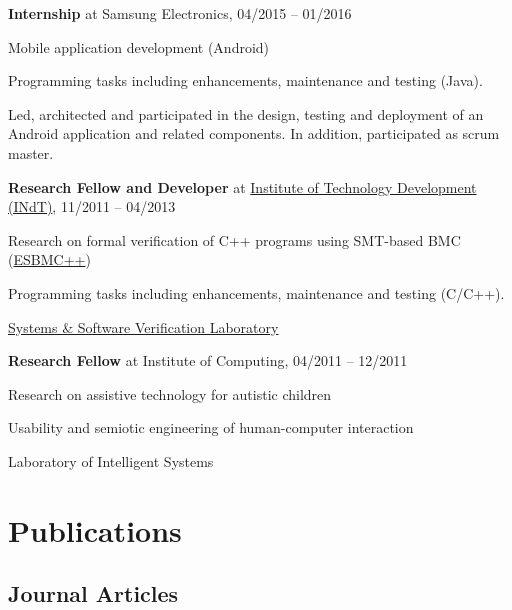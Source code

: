 \documentclass[letterpaper]{article}
\renewenvironment{itemize}{
  \begin{list}{}{
    \setlength{\leftmargin}{1.5em}
  }
}{
  \end{list}
}
\begin{document}
\begin{enumerate}
\begin{itemize}
      \end{itemize}
      \item{{\bf Internship} at Samsung Electronics, 04/2015 -- 01/2016}
      \begin{itemize}
        \item{\textendash} {Mobile application development (Android)}
        \item{\textendash} {Programming tasks including enhancements, maintenance and testing (Java).}
        \item{\textendash} {Led, architected and participated in the design, testing and deployment of an Android application and related components. In addition, participated as scrum master.}
      \end{itemize}
      \item{{\bf Research Fellow and Developer} at \href{http://www.indt.org.br}{Institute of Technology Development (INdT)}, 11/2011 -- 04/2013}
            \begin{itemize}
        \item{\textendash} {Research on formal verification of C++ programs using SMT-based BMC (\href{http://www.esbmc/}{ESBMC++})}
        \item{\textendash} {Programming tasks including enhancements, maintenance and testing (C/C++).}
        \item{\textendash} \href{https://ssvlab.github.io}{Systems \& Software Verification Laboratory}
      \end{itemize}
      \item{{\bf Research Fellow} at Institute of Computing, 04/2011 -- 12/2011}
            \begin{itemize}
        \item{\textendash} {Research on assistive technology for autistic children}
        \item{\textendash} {Usability and semiotic engineering of human-computer interaction}
        \item{\textendash} {Laboratory of Intelligent Systems}
      \end{itemize}
    \end{enumerate}
    
\section*{Publications}

\subsection*{Journal Articles}
\end{document}
